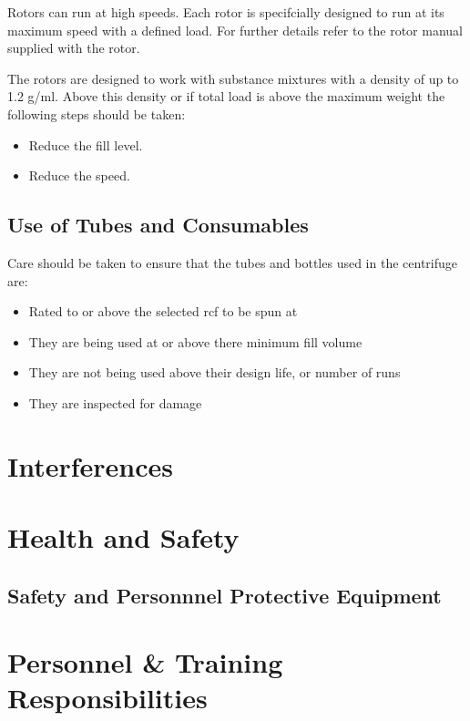 \documentclass[12pt]{../SOP3_beta}
\begin{document}
\NP Rotors can run at high speeds. Each rotor is specifcially designed to run at its maximum speed with a defined load. For further details refer to the rotor manual supplied with the rotor. 

\NP The rotors are designed to work with substance mixtures with a density of up to 1.2 g/ml. Above this density or if total load is above the maximum weight the following steps should be taken:

\begin{itemize}
  \item Reduce the fill level.
  \item Reduce the speed. 
\end{itemize}

\subsection*{Use of Tubes and Consumables}

\NP Care should be taken to ensure that the tubes and bottles used in the centrifuge are: 

\begin{itemize}
  \item Rated to or above the selected rcf to be spun at
  \item They are being used at or above there minimum fill volume
  \item They are not being used above their design life, or number of runs
  \item They are inspected for damage 
\end{itemize}

\section{Interferences}

\section{Health and Safety}

\subsection{Safety and Personnnel Protective Equipment}


\section{Personnel \& Training Responsibilities}
\end{document}
